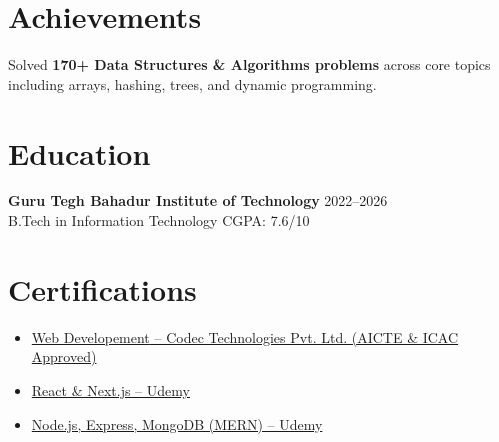 \documentclass[10pt, a4paper]{article}
\begin{document}
\section*{Achievements}
Solved \textbf{170+ Data Structures \& Algorithms problems} across core topics including arrays, hashing, trees, and dynamic programming.

\section*{Education}
\textbf{Guru Tegh Bahadur Institute of Technology} \hfill 2022--2026 \\
B.Tech in Information Technology \hfill CGPA: 7.6/10 

\section*{Certifications}
\begin{itemize}[leftmargin=*, itemsep=1pt, topsep=1pt]
\item \href{https://drive.google.com/file/d/1KNHM8GmuGeP59YP0wZ3OM3V9Rs1otgR0/view?usp=sharing}
{{Web Developement} -- Codec Technologies Pvt. Ltd. (AICTE \& ICAC Approved)}
\item \href{https://drive.google.com/file/d/12BYiE5F7gQt54RSHuHhewRt2csGEAr6F/view?usp=sharing}
{React \& Next.js -- Udemy}
\item \href{https://drive.google.com/file/d/1Jlx6HSB4emq9N7pFbUYwApuvzpSi00s4/view?usp=sharing}
{Node.js, Express, MongoDB (MERN) -- Udemy}
\end{itemize}
\end{document}
